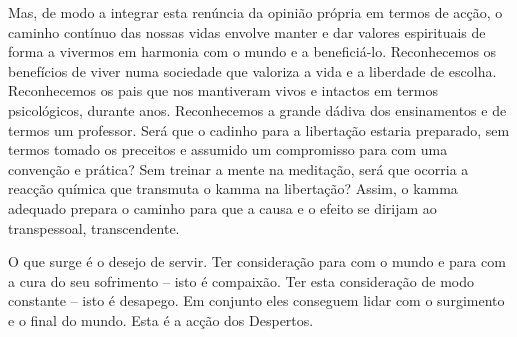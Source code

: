 Mas, de modo a integrar esta renúncia da opinião própria em termos de acção, o caminho contínuo das nossas vidas envolve manter e dar valores espirituais de forma a vivermos em harmonia com o mundo e a beneficiá-lo. Reconhecemos os benefícios de viver numa sociedade que valoriza a vida e a liberdade de escolha. Reconhecemos os pais que nos mantiveram vivos e intactos em termos psicológicos, durante anos. Reconhecemos a grande dádiva dos ensinamentos e de termos um professor. Será que o cadinho para a libertação estaria preparado, sem termos tomado os preceitos e assumido um compromisso para com uma convenção e prática? Sem treinar a mente na meditação, será que ocorria a reacção química que transmuta o kamma na libertação? Assim, o kamma adequado prepara o caminho para que a causa e o efeito se dirijam ao transpessoal, transcendente.

O que surge é o desejo de servir. Ter consideração para com o mundo e para com a cura do seu sofrimento -- isto é compaixão. Ter esta consideração de modo constante -- isto é desapego. Em conjunto eles conseguem lidar com o surgimento e o final do mundo. Esta é a acção dos Despertos.
